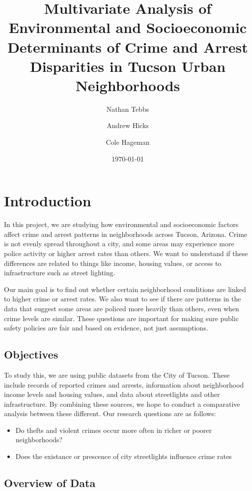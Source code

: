 \documentclass{report}
\title{Multivariate Analysis of Environmental and Socioeconomic Determinants of Crime and Arrest Disparities in Tucson Urban Neighborhoods}
\author{Nathan Tebbs \and Andrew Hicks \and Cole Hageman}
\date{\today}
\begin{document}
\maketitle
\tableofcontents


	\chapter{Introduction}
	
	In this project, we are studying how environmental and socioeconomic factors affect crime and arrest patterns in neighborhoods across Tucson, Arizona. Crime is not evenly spread throughout a city, and some areas may experience more police activity or higher arrest rates than others. We want to understand if these differences are related to things like income, housing values, or access to infrastructure such as street lighting.
	
	Our main goal is to find out whether certain neighborhood conditions are linked to higher crime or arrest rates. We also want to see if there are patterns in the data that suggest some areas are policed more heavily than others, even when crime levels are similar. These questions are important for making sure public safety policies are fair and based on evidence, not just assumptions.
	
	\newpage
	\section{Objectives}
	
	To study this, we are using public datasets from the City of Tucson. These include records of reported crimes and arrests, information about neighborhood income levels and housing values, and data about streetlights and other infrastructure. By combining these sources, we hope to conduct a comparative analysis between these different. Our research questions are as follows:
	
	\begin{itemize}
		\item Do thefts and violent crimes occur more often in richer or poorer neighborhoods?
		\item Does the existance or prescence of city streetlights influence crime rates
	\end{itemize}
	
	\section{Overview of Data}
	
\end{document}
